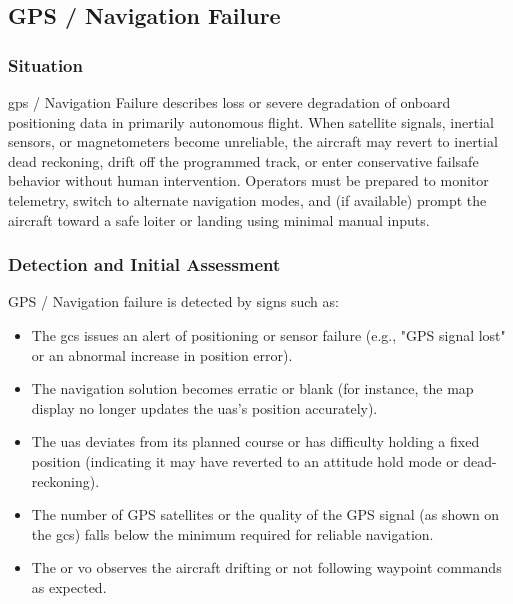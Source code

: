         \subsection{GPS / Navigation Failure}\label{ssec:ep-gpsfail}
        
            \subsubsection{Situation} \ac{gps} / Navigation Failure describes loss or severe degradation of onboard positioning data in primarily autonomous flight. When satellite signals, inertial sensors, or magnetometers become unreliable, the aircraft may revert to inertial dead reckoning, drift off the programmed track, or enter conservative failsafe behavior without human intervention. Operators must be prepared to monitor telemetry, switch to alternate navigation modes, and (if available) prompt the aircraft toward a safe loiter or landing using minimal manual inputs.

            \subsubsection{Detection and Initial Assessment} GPS / Navigation failure is detected by signs such as:
            
            \begin{itemize}
 
                \item The \ac{gcs} issues an alert of positioning or sensor failure (e.g., "GPS signal lost" or an abnormal increase in position error).

                \item The navigation solution becomes erratic or blank (for instance, the map display no longer updates the \ac{uas}'s position accurately).

                \item The \ac{uas} deviates from its planned course or has difficulty holding a fixed position (indicating it may have reverted to an attitude hold mode or dead-reckoning).

                \item The number of GPS satellites or the quality of the GPS signal (as shown on the \ac{gcs}) falls below the minimum required for reliable navigation.

                \item The  or \ac{vo} observes the aircraft drifting or not following waypoint commands as expected.

            \end{itemize}

